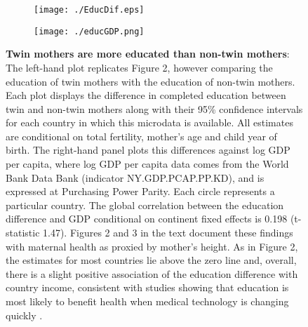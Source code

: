 \documentclass[12pt]{article}
\begin{document}
\begin{spacing}{1}
  
\begin{figure}[htpb!]
\begin{subfigure}{.5\textwidth}
  \texttt{[image: ./EducDif.eps]}
\end{subfigure}%
\begin{subfigure}{.5\textwidth}
  \texttt{[image: ./educGDP.png]}
\end{subfigure}%
\vspace{5mm}
\caption{\textbf{Twin mothers are more educated than non-twin mothers}: {\footnotesize The left-hand plot replicates Figure 2, however comparing the education of twin mothers with the education of non-twin mothers.  Each plot displays the difference in completed education between twin and non-twin mothers along with their 95\% confidence intervals for each country in which this microdata is available.  All estimates are conditional on total fertility, mother's age and child year of birth.  The right-hand panel plots this differences against log GDP per capita, where log GDP per capita data comes from the World Bank Data Bank (indicator NY.GDP.PCAP.PP.KD), and is expressed at Purchasing Power Parity.  Each circle represents a particular country. The global correlation between the education difference and GDP conditional on continent fixed effects is 0.198 (t-statistic 1.47). Figures 2 and 3 in the text document these findings with maternal health as proxied by mother's height. As in Figure 2, the estimates for most countries lie above the zero line and, overall, there is a slight positive association of the education difference with country income, consistent with studies showing that education is most likely to benefit health when medical technology is changing quickly \cite{LlerasMuneyGlied2008}.}}
\label{fig:educAll}
\end{figure}


\end{spacing}
\end{document}
